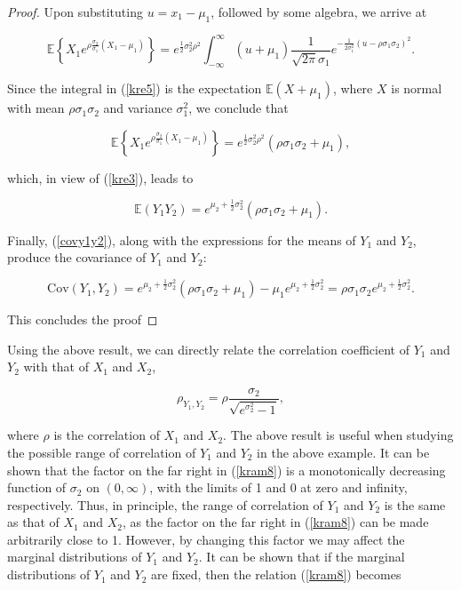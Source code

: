 \documentclass[
]{jss}
\begin{document}
\begin{proof}
Upon substituting $u=x_1-\mu_1$, followed by some algebra, we arrive at 

\begin{equation}
\mathbb E \left\{ X_1 e^{ \rho\frac{\sigma_2}{\sigma_1} (X_1-\mu_1)} \right\} = e^{\frac{1}{2}\sigma_2^2\rho^2} \int_{-\infty}^\infty (u+\mu_1)  \frac{1}{\sqrt{2\pi}\sigma_1} e^{-\frac{1}{2\sigma_1^2}(u-\rho\sigma_1\sigma_2)^2}.
\label{eq:kre5}
\end{equation}

Since the integral in (\ref{kre5}) is the expectation $\mathbb E(X+\mu_1)$, where $X$ is normal with mean $\rho\sigma_1\sigma_2$ and variance $\sigma_1^2$, we conclude that 

\begin{equation}
\mathbb E \left\{ X_1 e^{ \rho\frac{\sigma_2}{\sigma_1} (X_1-\mu_1)} \right\} = e^{\frac{1}{2}\sigma_2^2\rho^2} (\rho\sigma_1\sigma_2 +\mu_1),
\label{eq:kre6}
\end{equation}

which, in view of (\ref{kre3}), leads to 

\begin{equation}
\mathbb E (Y_1Y_2) = e^{\mu_2 + \frac{1}{2}\sigma_2^2} (\rho\sigma_1\sigma_2 +\mu_1).
\label{eq:kre7}
\end{equation}

Finally, (\ref{covy1y2}), along with the expressions for the means of $Y_1$ and $Y_2$, produce the covariance of $Y_1$ and $Y_2$:

\begin{equation}
\mbox{Cov}(Y_1, Y_2) = e^{\mu_2 + \frac{1}{2}\sigma_2^2} (\rho\sigma_1\sigma_2 +\mu_1) - \mu_1 e^{\mu_2 + \frac{1}{2}\sigma_2^2} = \rho\sigma_1\sigma_2 e^{\mu_2 + \frac{1}{2}\sigma_2^2}.
\label{eq:kre8}
\end{equation}

This concludes the proof
\end{proof}

Using the above result, we can directly relate the correlation coefficient of \(Y_1\) and \(Y_2\) with that of \(X_1\) and \(X_2\),

\begin{equation}
\rho_{Y_1, Y_2} = \rho \frac{\sigma_2}{\sqrt{e^{\sigma_2^2} -1}},
\label{eq:kram8}
\end{equation}

where \(\rho\) is the correlation of \(X_1\) and \(X_2\). The above result is useful when studying the possible range of correlation of \(Y_1\) and \(Y_2\) in the above example. It can be shown that the factor on the far right in (\ref{kram8}) is a monotonically decreasing function of \(\sigma_2\) on \((0,\infty)\), with the limits of 1 and 0 at zero and infinity, respectively. Thus, in principle, the range of correlation of \(Y_1\) and \(Y_2\) is the same as that of \(X_1\) and \(X_2\), as the factor on the far right in (\ref{kram8}) can be made arbitrarily close to 1. However, by changing this factor we may affect the marginal distributions of \(Y_1\) and \(Y_2\). It can be shown that if the marginal distributions of \(Y_1\) and \(Y_2\) are fixed, then the relation (\ref{kram8}) becomes
\end{document}
